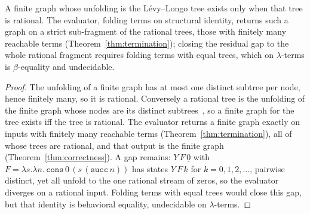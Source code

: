 \begin{theorem}\label{thm:ceiling}
  A finite graph whose unfolding is the L\'evy--Longo tree exists only when that tree is rational. The evaluator, folding terms on structural identity, returns such a graph on a strict sub-fragment of the rational trees, those with finitely many reachable terms (Theorem~\ref{thm:termination}); closing the residual gap to the whole rational fragment requires folding terms with equal trees, which on $\lambda$-terms is $\beta$-equality and undecidable.
\end{theorem}
\begin{proof}
  The unfolding of a finite graph has at most one distinct subtree per node, hence finitely many, so it is rational. Conversely a rational tree is the unfolding of the finite graph whose nodes are its distinct subtrees~\cite{courcelle1983-infinite-trees}, so a finite graph for the tree exists iff the tree is rational. The evaluator returns a finite graph exactly on inputs with finitely many reachable terms (Theorem~\ref{thm:termination}), all of whose trees are rational, and that output is the finite graph (Theorem~\ref{thm:correctness}). A gap remains: $Y\,F\,\underline{0}$ with $F = \lambda s.\lambda n.\,\mathtt{cons}\,0\,(s\,(\mathtt{succ}\,n))$ has states $Y\,F\,\underline{k}$ for $k = 0, 1, 2, \dots$, pairwise distinct, yet all unfold to the one rational stream of zeros, so the evaluator diverges on a rational input. Folding terms with equal trees would close this gap, but that identity is behavioral equality, undecidable on $\lambda$-terms.
\end{proof}

